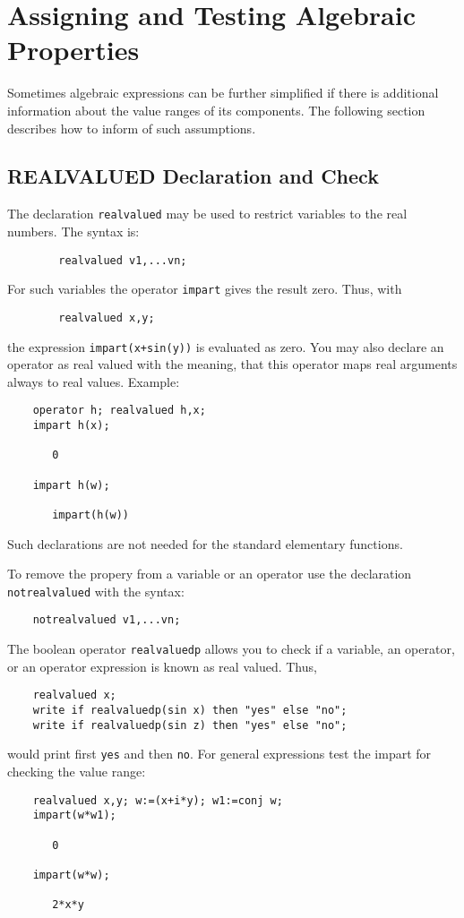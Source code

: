 \chapter{Assigning and Testing Algebraic Properties}

Sometimes algebraic expressions can be further simplified if
there is additional information about the value ranges
of its components. The following section describes 
how to inform {\REDUCE} of such assumptions.


\section{REALVALUED Declaration and Check}
\hypertarget{command:REALVALUED}{}
\hypertarget{command:NOTREALVALUED}{}

The declaration \texttt{realvalued}%
may be used 
to restrict variables to the real numbers. The syntax is:
\begin{verbatim}
        realvalued v1,...vn;
\end{verbatim}
For such variables the operator \texttt{impart} gives 
the result zero. Thus, with
\begin{verbatim}
        realvalued x,y;
\end{verbatim}
the expression \texttt{impart(x+sin(y))} is evaluated as zero.
You may also declare an operator as real valued
with the meaning, that this operator maps real arguments always to
real values. Example:
\begin{verbatim}
    operator h; realvalued h,x;
    impart h(x);
   
       0
  
    impart h(w);

       impart(h(w))
\end{verbatim}
Such declarations are not needed for the standard elementary functions.
        
To remove the propery from a variable or an operator use the declaration
\texttt{notrealvalued}
with the syntax:
\begin{verbatim}
    notrealvalued v1,...vn;
\end{verbatim}

\hypertarget{operator:REALVALUEDP}{}
The boolean operator \texttt{realvaluedp}
allows you to check if a variable, an operator, or
an operator expression is known as real valued.
Thus, 
\begin{verbatim}
    realvalued x;
    write if realvaluedp(sin x) then "yes" else "no";
    write if realvaluedp(sin z) then "yes" else "no";
\end{verbatim}
would print first \texttt{yes} and then \texttt{no}. For general
expressions test the impart for checking the value range:
\begin{verbatim}
    realvalued x,y; w:=(x+i*y); w1:=conj w;
    impart(w*w1);

       0

    impart(w*w);

       2*x*y
\end{verbatim}

